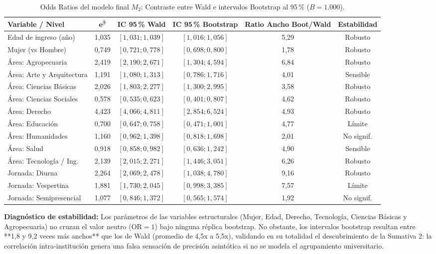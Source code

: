 \documentclass[11pt,a4paper]{article}
\begin{document}
\begin{table}[h!]
\centering
\small
\caption{Odds Ratios del modelo final $M_2$: Contraste entre Wald e intervalos Bootstrap al 95\,\% ($B=1.000$).}
\begin{tabular}{lccccc}
\toprule
\textbf{Variable / Nivel} & $\mathbf{e^{\widehat{\beta}}}$ & \textbf{IC 95\,\% Wald} & \textbf{IC 95\,\% Bootstrap} & \textbf{Ratio Ancho Boot/Wald} & \textbf{Estabilidad} \\
\midrule
Edad de ingreso (año)       & 1,035 & $[1,031; 1,039]$ & $[1,016; 1,056]$ & 5,29 & Robusto \\
Mujer (vs Hombre)           & 0,749 & $[0,721; 0,778]$ & $[0,698; 0,800]$ & 1,78 & Robusto \\
Área: Agropecuaria          & 2,419 & $[2,190; 2,671]$ & $[1,304; 4,594]$ & 6,84 & Robusto \\
Área: Arte y Arquitectura   & 1,191 & $[1,080; 1,313]$ & $[0,786; 1,716]$ & 4,01 & Sensible \\
Área: Ciencias Básicas      & 2,026 & $[1,803; 2,277]$ & $[1,300; 2,995]$ & 3,58 & Robusto \\
Área: Ciencias Sociales     & 0,578 & $[0,535; 0,623]$ & $[0,401; 0,807]$ & 4,62 & Robusto \\
Área: Derecho               & 4,423 & $[4,066; 4,811]$ & $[2,854; 6,524]$ & 4,93 & Robusto \\
Área: Educación             & 0,700 & $[0,647; 0,758]$ & $[0,471; 1,001]$ & 4,77 & Límite \\
Área: Humanidades           & 1,160 & $[0,962; 1,398]$ & $[0,818; 1,698]$ & 2,01 & No signif. \\
Área: Salud                 & 0,918 & $[0,858; 0,982]$ & $[0,636; 1,242]$ & 4,90 & Sensible \\
Área: Tecnología / Ing.     & 2,139 & $[2,015; 2,271]$ & $[1,446; 3,051]$ & 6,26 & Robusto \\
Jornada: Diurna             & 2,264 & $[2,069; 2,478]$ & $[1,038; 4,780]$ & 9,16 & Robusto \\
Jornada: Vespertina         & 1,881 & $[1,730; 2,045]$ & $[0,998; 3,385]$ & 7,57 & Límite \\
Jornada: Semipresencial     & 1,077 & $[0,846; 1,372]$ & $[0,565; 1,574]$ & 1,92 & No signif. \\
\bottomrule
\end{tabular}
\end{table}

\textbf{Diagnóstico de estabilidad:} Los parámetros de las variables estructurales (Mujer, Edad, Derecho, Tecnología, Ciencias Básicas y Agropecuaria) no cruzan el valor neutro ($\text{OR}=1$) bajo ninguna réplica bootstrap. No obstante, los intervalos bootstrap resultan entre **1,8 y 9,2 veces más anchos** que los de Wald (promedio de 4,5x a 5,5x), validando en su totalidad el descubrimiento de la Sumativa 2: la correlación intra-institución genera una falsa sensación de precisión asintótica si no se modela el agrupamiento universitario.
\end{document}

